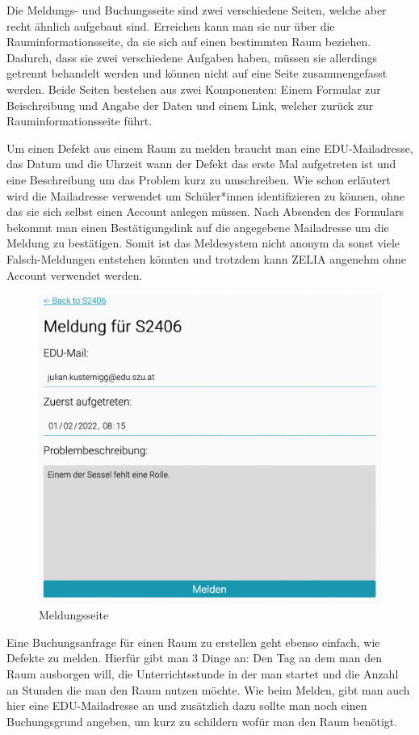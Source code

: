 
Die Meldungs- und Buchungsseite sind zwei verschiedene Seiten, welche aber recht ähnlich aufgebaut sind. Erreichen kann man sie nur über die Rauminformationsseite, da sie sich auf einen bestimmten Raum beziehen. Dadurch, dass sie zwei verschiedene Aufgaben haben, müssen sie allerdings getrennt behandelt werden und können nicht auf eine Seite zusammengefasst werden. Beide Seiten bestehen aus zwei Komponenten: Einem Formular zur Beischreibung und Angabe der Daten und einem Link, welcher zurück zur Rauminformationsseite führt.
  

Um einen Defekt aus einem Raum zu melden braucht man eine EDU-Mailadresse, das Datum und die Uhrzeit wann der Defekt das erste Mal aufgetreten ist und eine Beschreibung um das Problem kurz zu umschreiben. Wie schon erläutert wird die Mailadresse verwendet um Schüler*innen identifizieren zu können, ohne das sie sich selbst einen Account anlegen müssen. Nach Absenden des Formulars bekommt man einen Bestätigungslink auf die angegebene Mailadresse um die Meldung zu bestätigen. Somit ist das Meldesystem nicht anonym da sonst viele Falsch-Meldungen entstehen könnten und trotzdem kann ZELIA angenehm ohne Account verwendet werden. 

\begin{figure}[H]
    \centering
    \includegraphics[width=120mm]{media/WebComponents/Meldungsseite_light.png}
    \caption{Meldungsseite}
\end{figure}

Eine Buchungsanfrage für einen Raum zu erstellen geht ebenso einfach, wie Defekte zu melden. Hierfür gibt man 3 Dinge an: Den Tag an dem man den Raum ausborgen will, die Unterrichtsstunde in der man startet und die Anzahl an Stunden die man den Raum nutzen möchte. Wie beim Melden, gibt man auch hier eine EDU-Mailadresse an und zusätzlich dazu sollte man noch einen Buchungsgrund angeben, um kurz zu schildern wofür man den Raum benötigt.

